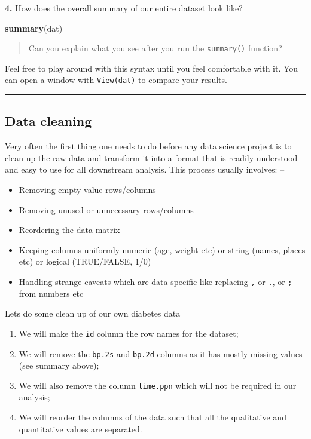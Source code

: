 \documentclass[
]{book}
\newenvironment{Shaded}{\begin{snugshade}}{\end{snugshade}}
\newcommand{\FunctionTok}[1]{\textcolor[rgb]{0.13,0.29,0.53}{\textbf{#1}}}
\newcommand{\NormalTok}[1]{#1}
\providecommand{\tightlist}{%
  \setlength{\itemsep}{0pt}\setlength{\parskip}{0pt}}
\begin{document}
\textbf{4.} How does the overall summary of our entire dataset look like?

\begin{Shaded}
\begin{Highlighting}[]
\FunctionTok{summary}\NormalTok{(dat)}
\end{Highlighting}
\end{Shaded}

\begin{quote}
Can you explain what you see after you run the \texttt{summary()} function?
\end{quote}

Feel free to play around with this syntax until you feel comfortable with it.
You can open a window with \texttt{View(dat)} to compare your results.

\begin{center}\rule{0.5\linewidth}{0.5pt}\end{center}

\hypertarget{data-cleaning}{%
\subsection{Data cleaning}\label{data-cleaning}}

Very often the first thing one needs to do before any data science project is to clean up the raw data and transform it into a format that is readily understood and easy to use for all downstream analysis.
This process usually involves: --

\begin{itemize}
\tightlist
\item
  Removing empty value rows/columns
\item
  Removing unused or unnecessary rows/columns
\item
  Reordering the data matrix
\item
  Keeping columns uniformly numeric (age, weight etc) or string (names, places etc) or logical (TRUE/FALSE, 1/0)
\item
  Handling strange caveats which are data specific like replacing \texttt{,} or \texttt{.}, or \texttt{;} from numbers etc
\end{itemize}

Lets do some clean up of our own diabetes data

\begin{enumerate}
\def\labelenumi{\arabic{enumi}.}
\tightlist
\item
  We will make the \texttt{id} column the row names for the dataset;
\item
  We will remove the \texttt{bp.2s} and \texttt{bp.2d} columns as it has mostly missing values (see summary above);
\item
  We will also remove the column \texttt{time.ppn} which will not be required in our analysis;
\item
  We will reorder the columns of the data such that all the qualitative and quantitative values are separated.
\end{enumerate}
\end{document}
